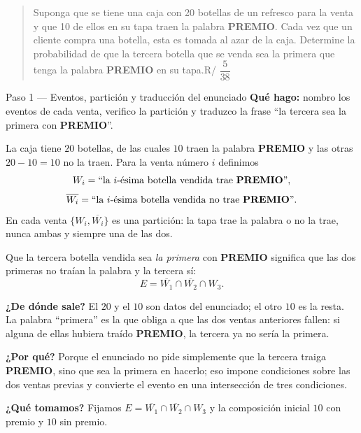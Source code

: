 \documentclass[11pt]{article}
\begin{document}
\begin{quote}
Suponga que se tiene una caja con 20 botellas de un refresco para la venta y que 10 de ellos en su tapa traen la palabra \textbf{PREMIO}. Cada vez que un cliente compra una botella, esta es tomada al azar de la caja. Determine la probabilidad de que la tercera botella que se venda sea la primera que tenga la palabra \textbf{PREMIO} en su tapa.\hfill R/ $\dfrac{5}{38}$
\end{quote}

\begin{paso}{Paso 1 --- Eventos, partición y traducción del enunciado}
\textbf{Qué hago:} nombro los eventos de cada venta, verifico la partición y traduzco la frase ``la tercera sea la primera con \textbf{PREMIO}''.

La caja tiene $20$ botellas, de las cuales $10$ traen la palabra \textbf{PREMIO} y las otras $20-10=10$ no la traen. Para la venta número $i$ definimos
\[
W_i=\text{``la $i$-ésima botella vendida trae \textbf{PREMIO}''},
\]
\[
\overline{W_i}=\text{``la $i$-ésima botella vendida no trae \textbf{PREMIO}''}.
\]
En cada venta $\{W_i,\overline{W_i}\}$ es una partición: la tapa trae la palabra o no la trae, nunca ambas y siempre una de las dos.

Que la tercera botella vendida sea \emph{la primera} con \textbf{PREMIO} significa que las dos primeras no traían la palabra y la tercera sí:
\[
E=\overline{W_1}\cap\overline{W_2}\cap W_3 .
\]

\textbf{¿De dónde sale?} El $20$ y el $10$ son datos del enunciado; el otro $10$ es la resta. La palabra ``primera'' es la que obliga a que las dos ventas anteriores fallen: si alguna de ellas hubiera traído \textbf{PREMIO}, la tercera ya no sería la primera.

\textbf{¿Por qué?} Porque el enunciado no pide simplemente que la tercera traiga \textbf{PREMIO}, sino que sea la primera en hacerlo; eso impone condiciones sobre las dos ventas previas y convierte el evento en una intersección de tres condiciones.

\textbf{¿Qué tomamos?} Fijamos $E=\overline{W_1}\cap\overline{W_2}\cap W_3$ y la composición inicial $10$ con premio y $10$ sin premio.
\end{paso}
\end{document}
